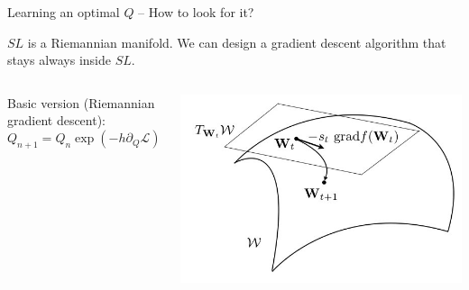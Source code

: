 \documentclass[10.5pt, aspectratio=169]{beamer} %
\begin{document}
\begin{frame}{Learning an optimal $Q$ -- How to look for it?}

$SL$ is a Riemannian manifold. We can design a gradient descent algorithm that stays always inside $SL$.

\medskip

\begin{columns}
\begin{column}{0.7\textwidth}

Basic version (Riemannian gradient descent):
\[
	Q_{n+1} = Q_n \exp\left( - h \partial_Q \mathcal L \right), \qquad \partial_Q \mathcal L = (\nabla \mathcal L)^\top
\]

\end{column}

\begin{column}{0.3\textwidth}
\includegraphics[width=\linewidth]{rgd}
\end{column}

\end{columns}
\end{frame}
\end{document}
